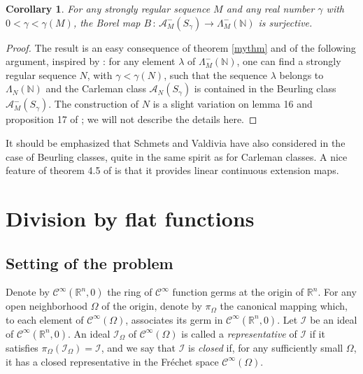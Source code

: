 \documentclass[a4paper]{amsart}
\theoremstyle{plain}
\newtheorem{cor}[subsubsection]{Corollary}
\theoremstyle{definition}
\theoremstyle{remark}
\begin{document}
\begin{cor}
For any strongly regular sequence $ M $ and any real number $ \gamma $ with
$ 0<\gamma<\gamma(M) $, the Borel map
$ B\, :\, \mathcal{A}^-_M(S_\gamma)\longrightarrow\Lambda^-_M(\mathbb{N}) $ is
surjective.
\end{cor}
\begin{proof} The result is an easy consequence of theorem \ref{mythm} and of the following argument, inspired by \cite{CC2}: for any element
$ \lambda $ of $ \Lambda^-_M(\mathbb{N}) $, one can find a strongly regular sequence
$ N $, with $ \gamma<\gamma(N) $, such that the sequence $ \lambda $ belongs to 
$ \Lambda_N(\mathbb{N}) $ and the Carleman class $ \mathcal{A}_N(S_\gamma) $ is contained in the Beurling class $ \mathcal{A}^-_M(S_\gamma) $. The construction of $ N $ is a slight variation on lemma 16 and proposition 17 of \cite{CC2}; we will not describe the details here. 
\end{proof} 

It should be emphasized that Schmets and Valdivia have also considered in \cite{SV} the case of Beurling classes, quite in the same spirit as for Carleman classes. A nice feature of theorem 4.5 of \cite{SV} is that it provides linear continuous extension maps.

\section{Division by flat functions}\label{div}

\subsection{Setting of the problem}\label{divback}

Denote by $ \mathcal{C}^\infty(\mathbb{R}^n,0) $ the ring of $ \mathcal{C}^\infty $ function germs
at the origin of $ \mathbb{R}^n $. For any open neighborhood $ \Omega $ of the origin,  denote by $ \pi_\Omega $ the canonical mapping which, to each element of
$ \mathcal{C}^\infty(\Omega) $, associates its germ in $ \mathcal{C}^\infty(\mathbb{R}^n,0) $. Let $ \mathcal{I} $ be an ideal of $ \mathcal{C}^\infty(\mathbb{R}^n,0) $. An ideal $ \mathcal{I}_\Omega$ of $ \mathcal{C}^\infty(\Omega) $ is called a \emph{representative} of $ \mathcal{I} $ if it satisfies $ \pi_\Omega(\mathcal{I}_\Omega)=\mathcal{I} $, and we say that $ \mathcal{I} $ is \emph{closed} if, for any sufficiently small $ \Omega $, it has a closed representative in the Fr\'echet space $ \mathcal{C}^\infty(\Omega) $.
\end{document}
